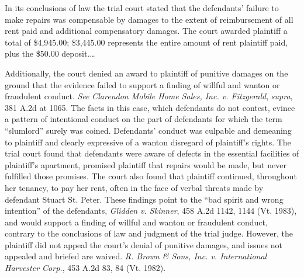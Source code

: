 In its conclusions of law the trial court stated that the defendants' failure to
make repairs was compensable by damages to the extent of reimbursement of all
rent paid and additional compensatory damages. The court awarded plaintiff a
total of \$4,945.00; \$3,445.00 represents the entire amount of rent plaintiff
paid, plus the \$50.00 deposit.\ldots

Additionally, the court denied an award to plaintiff of punitive damages on the
ground that the evidence failed to support a finding of willful and wanton or
fraudulent conduct. \textit{See} \textit{Clarendon Mobile Home Sales, Inc. v.
Fitzgerald}, \textit{supra}, 381 A.2d at 1065. The facts in this case, which
defendants do not contest, evince a pattern of intentional conduct on the part
of defendants for which the term ``slumlord'' surely was coined. Defendants'
conduct was culpable and demeaning to plaintiff and clearly expressive of a
wanton disregard of plaintiff's rights. The trial court found that defendants
were aware of defects in the essential facilities of plaintiff's apartment,
promised plaintiff that repairs would be made, but never fulfilled those
promises. The court also found that plaintiff continued, throughout her
tenancy, to pay her rent, often in the face of verbal threats made by defendant
Stuart St. Peter. These findings point to the ``bad spirit and wrong
intention'' of the defendants, \textit{Glidden v. Skinner}, 458 A.2d 1142, 1144
(Vt. 1983), and would support a finding of willful and wanton or fraudulent
conduct, contrary to the conclusions of law and judgment of the trial judge.
However, the plaintiff did not appeal the court's denial of punitive damages,
and issues not appealed and briefed are waived. \textit{R. Brown \& Sons, Inc.
v. International Harvester Corp.}, 453 A.2d 83, 84 (Vt. 1982).

